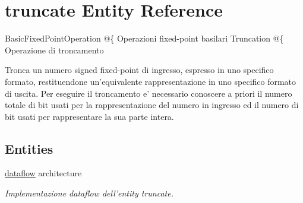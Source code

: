 \hypertarget{classtruncate}{\section{truncate Entity Reference}
\label{classtruncate}
}


Basic\+Fixed\+Point\+Operation @\{  Operazioni fixed-\/point basilari  Truncation @\{  Operazione di troncamento

Tronca un numero signed fixed-\/point di ingresso, espresso in uno specifico formato, restituendone un'equivalente rappresentazione in uno specifico formato di uscita. Per eseguire il troncamento e' necessario conoscere a priori il numero totale di bit usati per la rappresentazione del numero in ingresso ed il numero di bit usati per rappresentare la sua parte intera.  


\subsection*{Entities}
\begin{DoxyCompactItemize}
\item 
\hyperlink{classtruncate_1_1dataflow}{dataflow} architecture
\begin{DoxyCompactList}\small\item\em Implementazione dataflow dell'entity truncate. \end{DoxyCompactList}\end{DoxyCompactItemize}
